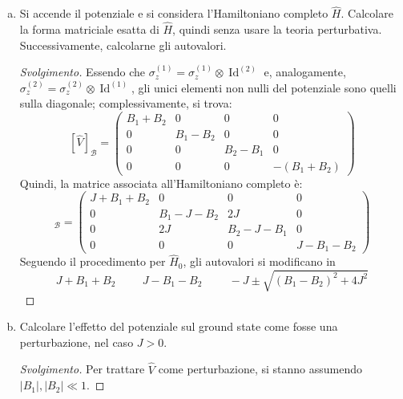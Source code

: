 \documentclass[11pt, a4paper]{scrartcl} %
\numberwithin{equation}{subsection}
\theoremstyle{style2}
\theoremstyle{style1}
\renewcommand\qedsymbol{$\blacksquare$}
\newenvironment{svolgimento}{\renewcommand\qedsymbol{$\spadesuit$}\begin{proof}[Svolgimento]}{\end{proof}}
\begin{document}
\begin{enumerate}[(a).]
Le autoenergie trovate, quindi, sono $J,J,J,-3J$; questo significa che, per $J>0$, lo stato fondamentale ha energia $-3J$ ed \`e un singoletto.
In questo caso, il comportamento del sistema \`e detto \textbf{anti-ferromagnetico}.

Se $J<0$, allora il sistema \`e detto \textbf{ferromagnetico} e il ground state ha energia $J$ e i tripletti che compongono lo stato fondamentale hanno spin diverso da 0 complessivamente, quindi il comportamento complessivo del sistema ha tendenze ferromangetiche.
\item Si accende il potenziale e si considera l'Hamiltoniano completo $\hat{H}$. 
	Calcolare la forma matriciale esatta di $\hat{H}$, quindi senza usare la teoria perturbativa.
	Successivamente, calcolarne gli autovalori.
	\begin{svolgimento}
		Essendo che $\sigma ^{(1)} _z = \sigma _z^{(1)} \otimes \operatorname{Id} ^{(2)}$ e, analogamente, $\sigma _z^{(2)}  =  \sigma _z^{(2)} \otimes \operatorname{Id} ^{(1)} $, gli unici elementi non nulli del potenziale sono quelli sulla diagonale; complessivamente, si trova:
		\[
			[\hat{V}]_\mathcal{B} = \begin{pmatrix} B_1+B_2 &0&0&0\\ 0& B_1-B_2 &0&0\\0&0&B_2-B_1 &0\\0&0&0&-(B_1+B_2) \end{pmatrix} 
		\] 
		Quindi, la matrice associata all'Hamiltoniano completo \`e:
		\begin{equation}
			[\hat{H}]_\mathcal{B} = \begin{pmatrix}  J + B_1+B_2 & 0 &0&0\\ 0 &B_1-J-B_2 & 2 J&0 \\ 0& 2J & B_2 -J - B_1 & 0 \\ 0& 0& 0& J - B_1-B_2\end{pmatrix} 
		\end{equation}
		Seguendo il procedimento per $\hat{H}_0$, gli autovalori si modificano in 
		\[
		J+B_1+B_2 \hspace{1cm} J - B_1 -B_2 \hspace{1cm}- J \pm\sqrt{(B_1-B_2)^2 + 4J^2} 
		\] 
	\end{svolgimento}
\item Calcolare l'effetto del potenziale sul ground state come fosse una perturbazione, nel caso $J > 0$.
	\begin{svolgimento}
		Per trattare $\hat{V}$ come perturbazione, si stanno assumendo $\lvert B_1 \rvert , \lvert B_2 \rvert \ll 1$.

\end{svolgimento}
\end{enumerate}
\end{document}
